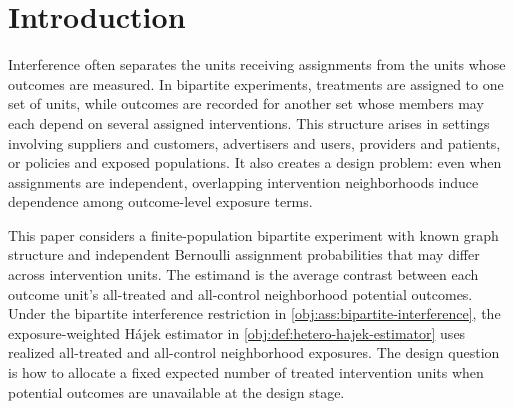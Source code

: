 \begin{abstract}
We study independent, heterogeneous Bernoulli assignment in bipartite experiments, where intervention units are assigned treatment and outcome units may depend on assignments in known intervention neighborhoods. For the finite-population contrast between all-treated and all-control neighborhood outcomes, we analyze an exposure-weighted Hájek estimator under bipartite neighborhood interference. With bounded potential outcomes, we derive a graph-and-design-dependent envelope that upper-bounds the design-based variance scale of its linearization and can be minimized subject to a positivity-constrained expected-treatment budget. Under the full assumptions of \cref{obj:thm:hetero-clt} and~\cref{obj:thm:postdesign-wald}, the envelope-optimal design supports asymptotic normality and a graph-only Wald scale yields asymptotically conservative coverage. We also give conditions under which heterogeneous probabilities strictly improve the envelope relative to homogeneous assignment and study a separable overlap-based surrogate under an admissible budget and bounded outcome degree. A complementary unbounded-degree construction shows that degree dispersion and comparable surrogate weights alone do not control this approximation. Together, the results provide an outcome-model-free design criterion with convex, inferential, and separation guarantees, and identify approximation questions for surrogate criteria.
\end{abstract}

\section{Introduction}

Interference often separates the units receiving assignments from the units whose outcomes are measured. In bipartite experiments, treatments are assigned to one set of units, while outcomes are recorded for another set whose members may each depend on several assigned interventions. This structure arises in settings involving suppliers and customers, advertisers and users, providers and patients, or policies and exposed populations. It also creates a design problem: even when assignments are independent, overlapping intervention neighborhoods induce dependence among outcome-level exposure terms.

This paper considers a finite-population bipartite experiment with known graph structure and independent Bernoulli assignment probabilities that may differ across intervention units. The estimand is the average contrast between each outcome unit's all-treated and all-control neighborhood potential outcomes. Under the bipartite interference restriction in \cref{obj:ass:bipartite-interference}, the exposure-weighted Hájek estimator in \cref{obj:def:hetero-hajek-estimator} uses realized all-treated and all-control neighborhood exposures. The design question is how to allocate a fixed expected number of treated intervention units when potential outcomes are unavailable at the design stage.


